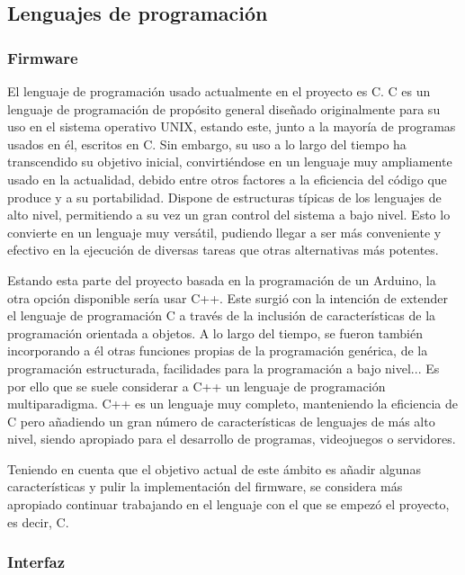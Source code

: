\subsection{Lenguajes de programación}

\subsubsection{Firmware}

El lenguaje de programación usado actualmente en el proyecto es C. C es un lenguaje de programación de propósito general diseñado originalmente para su uso en el sistema operativo UNIX, estando este, junto a la mayoría de programas usados en él, escritos en C. Sin embargo, su uso a lo largo del tiempo ha transcendido su objetivo inicial, convirtiéndose en un lenguaje muy ampliamente usado en la actualidad, debido entre otros factores a la eficiencia del código que produce y a su portabilidad. Dispone de estructuras típicas de los lenguajes de alto nivel, permitiendo a su vez un gran control del sistema a bajo nivel. Esto lo convierte en un lenguaje muy versátil, pudiendo llegar a ser más conveniente y efectivo en la ejecución de diversas tareas que otras alternativas más potentes. \cite{k&r}

Estando esta parte del proyecto basada en la programación de un Arduino, la otra opción disponible sería usar C++. Este surgió con la intención de extender el lenguaje de programación C a través de la inclusión de características de la programación orientada a objetos. A lo largo del tiempo, se fueron también incorporando a él otras funciones propias de la programación genérica, de la programación estructurada, facilidades para la programación a bajo nivel... Es por ello que se suele considerar a C++ un lenguaje de programación multiparadigma. C++ es un lenguaje muy completo, manteniendo la eficiencia de C pero añadiendo un gran número de características de lenguajes de más alto nivel, siendo apropiado para el desarrollo de programas, videojuegos o servidores.

Teniendo en cuenta que el objetivo actual de este ámbito es añadir algunas características y pulir la implementación del firmware, se considera más apropiado continuar trabajando en el lenguaje con el que se empezó el proyecto, es decir, C. 

\subsubsection{Interfaz}

